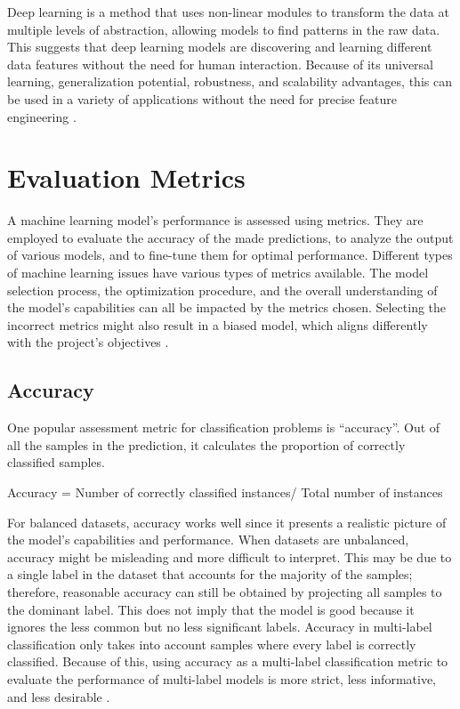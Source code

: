 Deep learning is a method that uses non-linear modules to transform the data at multiple levels of abstraction, allowing models to find patterns in the raw data. This suggests that deep learning models are discovering and learning different data features without the need for human interaction. Because of its universal learning, generalization potential, robustness, and scalability advantages, this can be used in a variety of applications without the need for precise feature engineering \citep{helland_tackling_2023}.

\section{Evaluation Metrics}

A machine learning model's performance is assessed using metrics. They are employed to evaluate the accuracy of the made predictions, to analyze the output of various models, and to fine-tune them for optimal performance. Different types of machine learning issues have various types of metrics available. The model selection process, the optimization procedure, and the overall understanding of the model's capabilities can all be impacted by the metrics chosen. Selecting the incorrect metrics might also result in a biased model, which aligns differently with the project's objectives \citep{helland_tackling_2023}.

\subsection{Accuracy}

One popular assessment metric for classification problems is “accuracy”. Out of all the samples in the prediction, it calculates the proportion of correctly classified samples. 

Accuracy = Number of correctly classified instances/ Total number of instances

For balanced datasets, accuracy works well since it presents a realistic picture of the model's capabilities and performance. When datasets are unbalanced, accuracy might be misleading and more difficult to interpret. This may be due to a single label in the dataset that accounts for the majority of the samples; therefore, reasonable accuracy can still be obtained by projecting all samples to the dominant label. This does not imply that the model is good because it ignores the less common but no less significant labels. Accuracy in multi-label classification only takes into account samples where every label is correctly classified. Because of this, using accuracy as a multi-label classification metric to evaluate the performance of multi-label models is more strict, less informative, and less desirable \citep{helland_tackling_2023}.